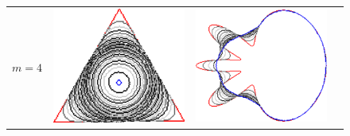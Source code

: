 {\begin{figure}
\begin{tabular}{p{3em}ccc}
$m=4$ & \includegraphics[scale=0.25]{figures/chapter6/level-effect/triangle/improve/len_pen0/radius-5/level4/summary.pdf} &
\includegraphics[scale=0.25]{figures/chapter6/level-effect/flower/improve/len_pen0/radius-5/level4/summary.pdf} &

\end{tabular}
\end{figure}}
